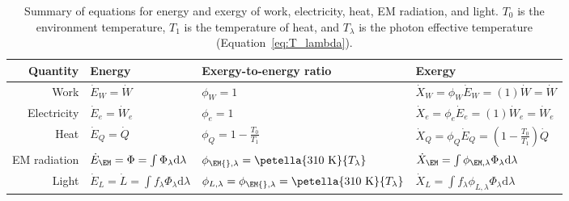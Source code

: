 

\begin{table}
\centering %
\caption{Summary of equations for energy and exergy of work, electricity, heat, EM radiation, and light.
         $T_0$ is the environment temperature, $T_1$ is the temperature of heat, 
         and $T_\lambda$ is the photon effective temperature
         (Equation~\ref{eq:T_lambda}).}
\begin{tabular}{r l l l}
  \toprule
  Quantity & Energy & Exergy-to-energy ratio & Exergy \\
  \midrule
  Work        
      & $\dot{E}_W = \dot{W}$
      & $\phi_W = 1$
      & $\dot{X}_W = \phi_W \dot{E}_W = (1) \dot{W} = \dot{W}$ \\
  Electricity 
      & $\dot{E}_e = \dot{W}_e$
      & $\phi_e = 1$
      & $\dot{X}_e = \phi_e \dot{E}_e = (1) \dot{W}_e = \dot{W}_e$ \\
  Heat 
      & $\dot{E}_Q = \dot{Q}$   
      & $\phi_Q = 1 - \frac{T_0}{T_1}$  
      & $ \dot{X}_Q = \phi_Q \dot{E}_Q = \left( 1 - \frac{T_0}{T_1} \right) \dot{Q}  $ \\
  EM radiation
      & $\dot{E}_{\EM} = \Phi = \int \Phi_\lambda \mathrm{d}\lambda$ 
      & $\phi_{\EM{},\lambda} = \petella{310 \text{ K}}{T_\lambda}$ 
      & $\dot{X}_{\EM} = \int \phi_{\EM,\lambda} \Phi_\lambda \mathrm{d}\lambda$ \\
  Light
      & $\dot{E}_L = \dot{L} = \int f_\lambda \Phi_\lambda \mathrm{d}\lambda$
      & $\phi_{L,\lambda} = \phi_{\EM{},\lambda} = \petella{310 \text{ K}}{T_\lambda}$ 
      & $\dot{X}_L = \int f_\lambda \phi_{L,\lambda} \Phi_\lambda \mathrm{d}\lambda$ \\
  \bottomrule
\end{tabular}
\label{tab:EX_summary}
\end{table}


